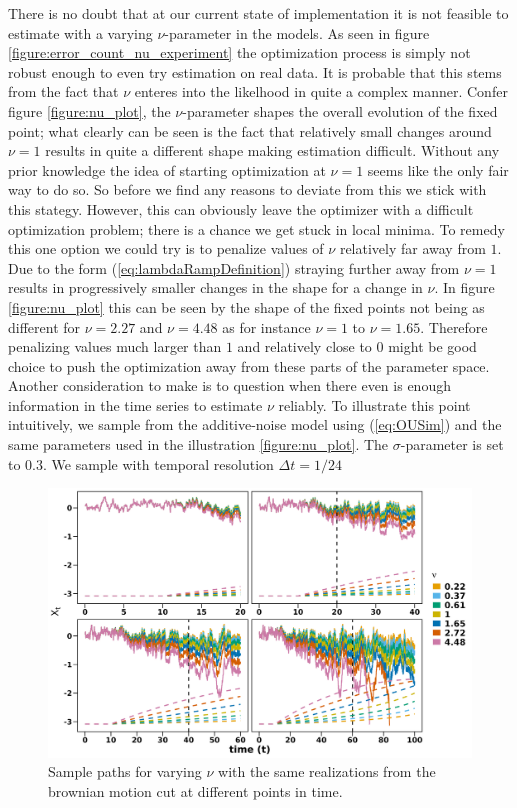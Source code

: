  There is no doubt that at our current state of implementation it is not feasible to estimate with a varying $\nu$-parameter in the models. As seen in figure \ref{figure:error_count_nu_experiment} the optimization process is simply not robust enough to even try estimation on real data. It is probable that this stems from the fact that $\nu$ enteres into the likelhood in quite a complex manner. Confer figure \ref{figure:nu_plot}, the $\nu$-parameter shapes the overall evolution of the fixed point; what clearly can be seen is the fact that relatively small changes around $\nu = 1$ results in quite a different shape making estimation difficult. Without any prior knowledge the idea of starting optimization at $\nu = 1$ seems like the only fair way to do so. So before we find any reasons to deviate from this we stick with this stategy. However, this can obviously leave the optimizer with a difficult optimization problem; there is a chance we get stuck in local minima. To remedy this one option we could try is to penalize values of $\nu$ relatively far away from $1$. Due to the form (\ref{eq:lambdaRampDefinition}) straying further away from $\nu = 1$ results in progressively smaller changes in the shape for a change in $\nu$. In figure \ref{figure:nu_plot} this can be seen by the shape of the fixed points not being as different for $\nu = 2.27$ and $\nu = 4.48$ as for instance $\nu = 1$ to $\nu = 1.65$. Therefore penalizing values much larger than $1$ and relatively close to $0$ might be good choice to push the optimization away from these parts of the parameter space. Another consideration to make is to question when there even is enough information in the time series to estimate $\nu$ reliably. To illustrate this point intuitively, we sample from the additive-noise model using (\ref{eq:OUSim}) and the same parameters used in the illustration \ref{figure:nu_plot}. The $\sigma$-parameter is set to $0.3$. We sample with temporal resolution $\Delta t = 1/24$
\begin{figure}[h!]
    \begin{center}
    \includegraphics[scale = .13]{figures/mu_simulations_discussion_plot.jpeg}
    \caption{Sample paths for varying $\nu$ with the same realizations from the brownian motion cut at different points in time.}
    \label{figure:mu_simulations_discussion_plot}
    \end{center}
\end{figure}\\
